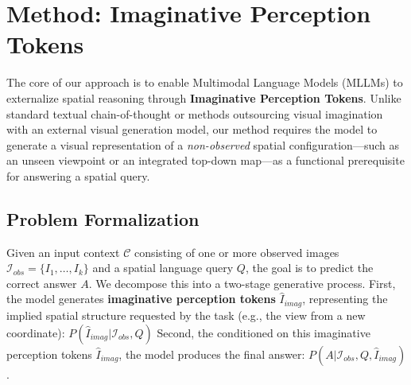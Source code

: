 




\section{Method: Imaginative Perception Tokens}


The core of our approach is to enable Multimodal Language Models (MLLMs) to externalize spatial reasoning through \textbf{Imaginative Perception Tokens}.
Unlike standard textual chain-of-thought
or methods outsourcing visual imagination with an external visual generation model, our method requires the model to generate a visual representation of a \textit{non-observed} spatial configuration---such as an unseen viewpoint or an integrated top-down map---as a functional prerequisite for answering a spatial query.

\subsection{Problem Formalization}
Given an input context $\mathcal{C}$ consisting of one or more observed images $\mathcal{I}_{obs} = \{I_1, \dots, I_k\}$ and a spatial language query $Q$, the goal is to predict the correct answer $A$.
We decompose this into a two-stage generative process.
First, the model generates \textbf{imaginative perception tokens} $\hat{I}_{imag}$, representing the implied spatial structure requested by the task (e.g., the view from a new coordinate): $P(\hat{I}_{imag} | \mathcal{I}_{obs}, Q)$
Second, the conditioned on this imaginative perception tokens $\hat{I}_{imag}$, the model produces the final answer: $P(A | \mathcal{I}_{obs}, Q, \hat{I}_{imag})$.


